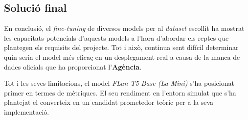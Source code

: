 \subsection{Solució final}
En conclusió, el \textit{fine-tuning} de diversos models per al \textit{dataset} escollit ha mostrat les capacitats potencials d'aquests models a l'hora d'abordar els reptes que plantegen els requisits del projecte. Tot i això, continua sent difícil determinar quin seria el model més eficaç en un desplegament real a causa de la manca de dades oficials que ha proporcionat l'\textbf{Agència}.

Tot i les seves limitacions, el model \textit{FLan-T5-Base (La Mini)} s'ha posicionat primer en termes de mètriques. El seu rendiment en l'entorn simulat que s'ha plantejat el converteix en un candidat prometedor teòric per a la seva implementació. 

